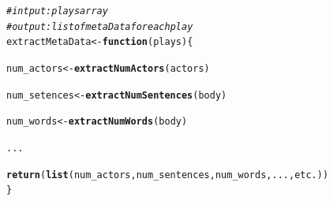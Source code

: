 \documentclass{article}\usepackage[]{graphicx}\usepackage[]{color}
\makeatletter
\newcommand{\hlcom}[1]{\textcolor[rgb]{0.678,0.584,0.686}{\textit{#1}}}%
\newcommand{\hlstd}[1]{\textcolor[rgb]{0.345,0.345,0.345}{#1}}%
\newcommand{\hlkwa}[1]{\textcolor[rgb]{0.161,0.373,0.58}{\textbf{#1}}}%
\newcommand{\hlkwb}[1]{\textcolor[rgb]{0.69,0.353,0.396}{#1}}%
\newcommand{\hlkwc}[1]{\textcolor[rgb]{0.333,0.667,0.333}{#1}}%
\newcommand{\hlkwd}[1]{\textcolor[rgb]{0.737,0.353,0.396}{\textbf{#1}}}%
\newenvironment{kframe}{%
 \def\at@end@of@kframe{}%
 \ifinner\ifhmode%
  \def\at@end@of@kframe{\end{minipage}}%
  \begin{minipage}{\columnwidth}%
 \fi\fi%
 \def\FrameCommand##1{\hskip\@totalleftmargin \hskip-\fboxsep
 \colorbox{shadecolor}{##1}\hskip-\fboxsep
     \hskip-\linewidth \hskip-\@totalleftmargin \hskip\columnwidth}%
 \MakeFramed {\advance\hsize-\width
   \@totalleftmargin\z@ \linewidth\hsize
   \@setminipage}}%
 {\par\unskip\endMakeFramed%
 \at@end@of@kframe}
\newenvironment{knitrout}{}{} %
\makeatother
\begin{document}
\begin{knitrout}
\color{fgcolor}\begin{kframe}
\begin{alltt}
\hlcom{#intput: plays array}
\hlcom{#output: list of metaData for each play}
\hlstd{extractMetaData} \hlkwb{<-} \hlkwa{function}\hlstd{(}\hlkwc{plays}\hlstd{) \{}

    \hlstd{num_actors} \hlkwb{<-} \hlkwd{extractNumActors}\hlstd{(actors)}

    \hlstd{num_setences} \hlkwb{<-} \hlkwd{extractNumSentences}\hlstd{(body)}

    \hlstd{num_words} \hlkwb{<-} \hlkwd{extractNumWords}\hlstd{(body)}

    \hlstd{...}

    \hlkwd{return}\hlstd{(}\hlkwd{list}\hlstd{(num_actors, num_sentences, num_words, ..., etc.))}
\hlstd{\}}
\end{alltt}
\end{kframe}
\end{knitrout}
\end{document}
